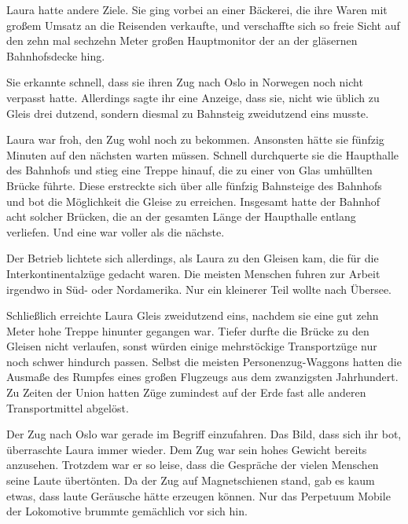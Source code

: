 \par

Laura hatte andere Ziele. Sie ging vorbei an einer Bäckerei, die ihre Waren mit großem Umsatz an die Reisenden verkaufte, und verschaffte sich so freie Sicht auf den zehn mal sechzehn Meter großen Hauptmonitor der an der gläsernen Bahnhofsdecke hing.

\par

Sie erkannte schnell, dass sie ihren Zug nach Oslo in Norwegen noch nicht verpasst hatte. Allerdings sagte ihr eine Anzeige, dass sie, nicht wie üblich zu Gleis drei dutzend, sondern diesmal zu Bahnsteig zweidutzend eins musste.

\par

Laura war froh, den Zug wohl noch zu bekommen. Ansonsten hätte sie fünfzig Minuten auf den nächsten warten müssen. Schnell durchquerte sie die Haupthalle des Bahnhofs und stieg eine Treppe hinauf, die zu einer von Glas umhüllten Brücke führte. Diese erstreckte sich über alle fünfzig Bahnsteige des Bahnhofs und bot die Möglichkeit die Gleise zu erreichen. Insgesamt hatte der Bahnhof acht solcher Brücken, die an der gesamten Länge der Haupthalle entlang verliefen. Und eine war voller als die nächste.

\par

Der Betrieb lichtete sich allerdings, als Laura zu den Gleisen kam, die für die Interkontinentalzüge gedacht waren. Die meisten Menschen fuhren zur Arbeit irgendwo in Süd- oder Nordamerika. Nur ein kleinerer Teil wollte nach Übersee.

\par

Schließlich erreichte Laura Gleis zweidutzend eins, nachdem sie eine gut zehn Meter hohe Treppe hinunter gegangen war. Tiefer durfte die Brücke zu den Gleisen nicht verlaufen, sonst würden einige mehrstöckige Transportzüge nur noch schwer hindurch passen. Selbst die meisten Personenzug-Waggons hatten die Ausmaße des Rumpfes eines großen Flugzeugs aus dem zwanzigsten Jahrhundert. Zu Zeiten der Union hatten Züge zumindest auf der Erde fast alle anderen Transportmittel abgelöst.

\par

Der Zug nach Oslo war gerade im Begriff einzufahren. Das Bild, dass sich ihr bot, überraschte Laura immer wieder. Dem Zug war sein hohes Gewicht bereits anzusehen. Trotzdem war er so leise, dass die Gespräche der vielen Menschen seine Laute übertönten. Da der Zug auf Magnetschienen stand, gab es kaum etwas, dass laute Geräusche hätte erzeugen können. Nur das Perpetuum Mobile der Lokomotive brummte gemächlich vor sich hin.

